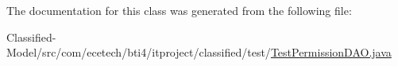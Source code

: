 The documentation for this class was generated from the following file\+:\begin{DoxyCompactItemize}
\item 
Classified-\/\+Model/src/com/ecetech/bti4/itproject/classified/test/\hyperlink{_test_permission_d_a_o_8java}{Test\+Permission\+D\+A\+O.\+java}\end{DoxyCompactItemize}
